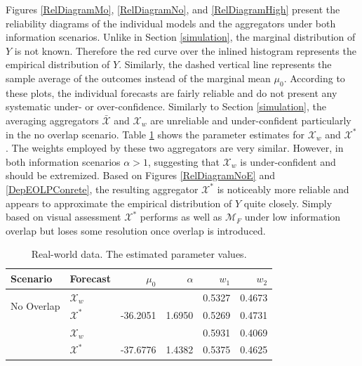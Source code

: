 \documentclass[11pt]{article}
\theoremstyle{definition}
\theoremstyle{definition}
\begin{document}
Figures \ref{RelDiagramMo}, \ref{RelDiagramNo}, and \ref{RelDiagramHigh} present the reliability diagrams of the individual models and the aggregators under both information scenarios. Unlike in Section \ref{simulation}, the marginal distribution of $Y$ is not known. Therefore the red curve over the inlined histogram represents the empirical distribution of $Y$. Similarly, the dashed vertical line represents the sample average of the outcomes instead of the marginal mean $\mu_0$. According to these plots, the individual forecasts are fairly reliable and do not present any systematic under- or over-confidence. Similarly to Section \ref{simulation}, the averaging aggregators $\bar{\mathcal{X}}$ and $\mathcal{X}_w$ are  unreliable and under-confident particularly in the no overlap scenario. Table \ref{NoParamsReal} shows the parameter estimates for $\mathcal{X}_w$ and $\mathcal{X}^*$. The weights employed by these two aggregators are very similar. However, in both information scenarios $\alpha > 1$, suggesting that $\mathcal{X}_w$ is under-confident and should be extremized. Based on Figures \ref{RelDiagramNoE} and  \ref{DepEOLPConrete}, the resulting aggregator $\mathcal{X}^*$ is noticeably more reliable and appears to approximate the empirical distribution of $Y$ quite closely. Simply based on visual assessment $\mathcal{X}^*$ performs as well as $\mathcal{M}_F$ under low information overlap but  loses some resolution once  overlap is introduced. 

\begin{table}[ht]
\centering
\caption{Real-world data. The estimated parameter values.} 
\begin{tabular}{llrrrr}
   \hline \hline
Scenario & Forecast & $\mu_0$ & $\alpha$ & $w_1$ & $w_2$\\
  \hline
\multirow{2}{*}{No Overlap} & $\mathcal{X}_w$ &  &  & 0.5327 & 0.4673 \\ 
&  $\mathcal{X}^*$ & -36.2051 & 1.6950 & 0.5269 & 0.4731 \\  \rule{0pt}{2.9ex} 
\multirow{2}{*}{High Overlap}  & $\mathcal{X}_w$ &  &  & 0.5931 & 0.4069 \\ 
 & $\mathcal{X}^*$ & -37.6776 & 1.4382 & 0.5375 & 0.4625 \\ 
   \hline
\end{tabular}
\label{NoParamsReal}
\end{table}
\end{document}
